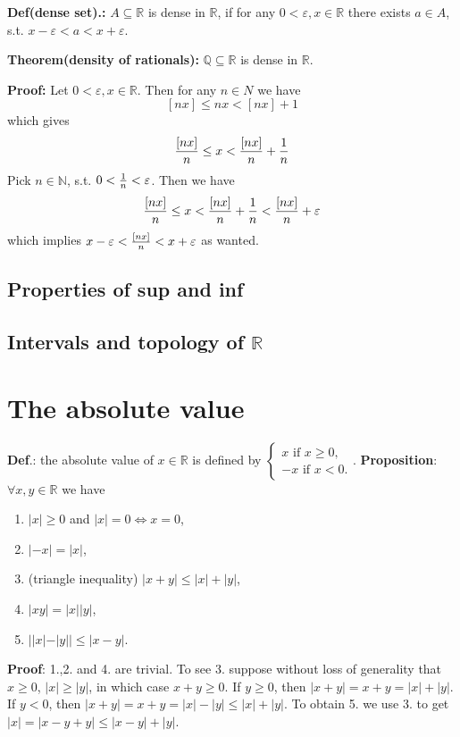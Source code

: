 \documentclass{article}
\begin{document}
\textbf{Def(dense set).:} $A\subseteq \mathbb{R}$ is dense in $\mathbb{R}$, if for any $0<\varepsilon, x\in \mathbb{R}$ there exists $a\in A$, s.t. $x-\varepsilon<a<x+\varepsilon$.

\textbf{Theorem(density of rationals):} $\mathbb{Q\subseteq\mathbb{R}}$ is dense in $\mathbb{R}$.

\textbf{Proof:} Let $0<\varepsilon, x\in \mathbb{R}$. Then for any $n\in N$ we have 
\[
[nx]\leq nx<[nx] + 1
\]
which gives
\[
{[nx]\over n}\leq x <{[nx]\over n} + {1\over n}
\]
Pick $n\in \mathbb{N}$, s.t. $0<{1\over n}<\varepsilon$. Then we have
\[
{[nx]\over n}\leq x <{[nx]\over n} +{1\over n}<{[nx]\over n} +\varepsilon
\]
which implies $x-\varepsilon<{[nx]\over n} <x+\varepsilon$ as wanted.

\subsection{Properties of sup and inf}



\subsection{\texorpdfstring{Intervals and topology of $\mathbb{R}$}{Intervals and topology of R}}

\section{The absolute value}

\textbf{Def}.: the absolute value of $x \in \mathbb{R}$ is defined by 
$\begin{cases}
x \text{ if } x \geq 0,\\
-x \text{ if } x < 0.
\end{cases}.$
\textbf{Proposition}: $\forall x, y \in \mathbb{R}$ we have 
\begin{enumerate}
    \item $|x| \geq 0$ and $|x| = 0 \iff x = 0$,
    \item $|-x| = |x|$,
    \item (triangle inequality) $|x + y| \leq |x| + |y|$,
    \item $|xy| = |x||y|$,
    \item $||x| - |y|| \leq |x - y|$.
\end{enumerate}

\textbf{Proof}: 1.,2. and 4. are trivial. To see 3. suppose without loss of generality that $x \geq 0$, $|x| \geq |y|$, in which case $x + y \geq 0$. If $y \geq 0$, then $|x + y| = x + y = |x| + |y|$. If $y < 0$, then $|x + y| = x + y = |x| - |y| \leq |x| + |y|$. To obtain 5. we use 3. to get $|x| = |x - y + y| \leq |x - y| + |y|$.
\end{document}
